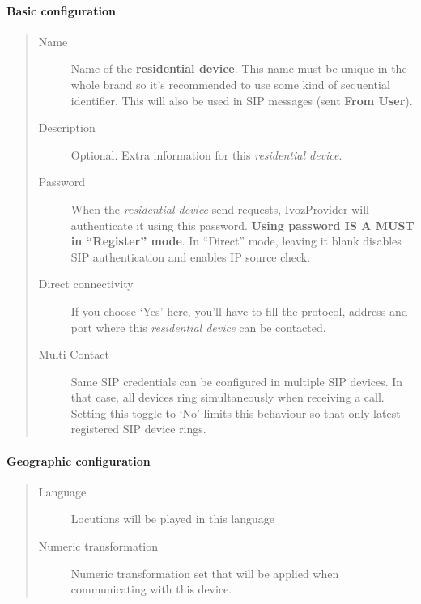 \documentclass[letterpaper,10pt,english]{sphinxmanual}
\begin{document}
\paragraph{Basic configuration}
\label{administration_portal/client/residential/residential_devices:basic-configuration}\begin{quote}
\begin{description}
\item[{Name}] \leavevmode
Name of the \textbf{residential device}. This name must be unique in the whole brand so
it's recommended to use some kind of sequential identifier. This will also be used
in SIP messages (sent \textbf{From User}).

\item[{Description}] \leavevmode
Optional. Extra information for this \emph{residential device}.

\item[{Password}] \leavevmode
When the \emph{residential device} send requests, IvozProvider will authenticate it using
this password. \textbf{Using password IS A MUST in ``Register'' mode}. In ``Direct'' mode,
leaving it blank disables SIP authentication and enables IP source check.

\item[{Direct connectivity}] \leavevmode
If you choose `Yes' here, you'll have to fill the protocol, address and
port where this \emph{residential device} can be contacted.

\item[{Multi Contact}] \leavevmode
Same SIP credentials can be configured in multiple SIP devices. In that case, all devices ring
simultaneously when receiving a call. Setting this toggle to `No' limits this behaviour so that
only latest registered SIP device rings.

\end{description}
\end{quote}


\paragraph{Geographic configuration}
\label{administration_portal/client/residential/residential_devices:geographic-configuration}\begin{quote}
\begin{description}
\item[{Language}] \leavevmode
Locutions will be played in this language

\item[{Numeric transformation}] \leavevmode
Numeric transformation set that will be applied when communicating with this device.

\end{description}
\end{quote}
\end{document}
